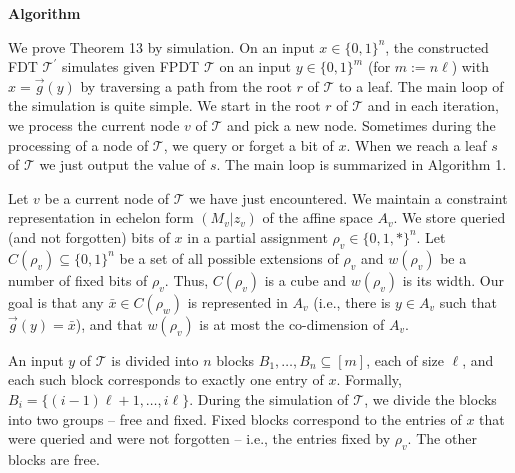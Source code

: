 


\par\medskip\noindent\textbf{Algorithm}\par




We prove Theorem 13 by simulation.
On an input $x\in\{0,1\}^{n}$, the constructed FDT $\mathcal{T}^{\prime}$ simulates given FPDT $\mathcal{T}$ on an input $y\in\{0,1\}^{m}$ (for $m:=n\ell$) with $x=\overrightarrow{g}(y)$ by traversing a path from the root $r$ of $\mathcal{T}$ to a leaf.
The main loop of the simulation is quite simple.
We start in the root $r$ of $\mathcal{T}$ and in each iteration, we process the current node $v$ of $\mathcal{T}$ and pick a new node.
Sometimes during the processing of a node of $\mathcal{T}$, we query or forget a bit of $x$.
When we reach a leaf $s$ of $\mathcal{T}$ we just output the value of $s$.
The main loop is summarized in Algorithm 1.\par




Let $v$ be a current node of $\mathcal{T}$ we have just encountered.
We maintain a constraint representation in echelon form $(M_{v}|z_{v})$ of the affine space $A_{v}$.
We store queried (and not forgotten) bits of $x$ in a partial assignment $\rho_{v}\in\{0,1,*\}^{n}$.
Let $C(\rho_{v})\subseteq\{0,1\}^{n}$ be a set of all possible extensions of $\rho_{v}$ and $w(\rho_{v})$ be a number of fixed bits of $\rho_{v}$.
Thus, $C(\rho_{v})$ is a cube and $w(\rho_{v})$ is its width.
Our goal is that any $\bar{x}\in C(\rho_{w})$ is represented in $A_{v}$ (i.e., there is $y\in A_{v}$ such that $\overrightarrow{g}(y)=\bar{x}$), and that $w(\rho_{v})$ is at most the co-dimension of $A_{v}$.\par




An input $y$ of $\mathcal{T}$ is divided into $n$ blocks $B_{1},\dots,B_{n}\subseteq[m]$, each of size $\ell$, and each such block corresponds to exactly one entry of $x$.
Formally, $B_{i}=\{(i-1)\ell+1,\dots,i\ell\}$.
During the simulation of $\mathcal{T}$, we divide the blocks into two groups – free and fixed.
Fixed blocks correspond to the entries of $x$ that were queried and were not forgotten – i.e., the entries fixed by $\rho_{v}$.
The other blocks are free.\par




